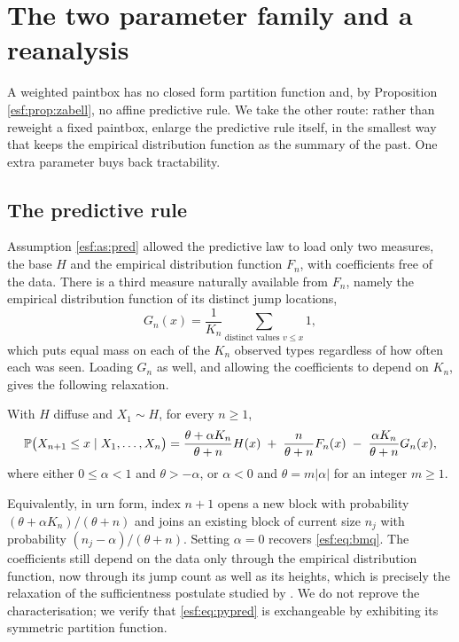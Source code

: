 \section{The two parameter family and a reanalysis}
\label{esf:sec:twoparam}

A weighted paintbox has no closed form partition function and, by Proposition
\ref{esf:prop:zabell}, no affine predictive rule. We take the other route: rather than
reweight a fixed paintbox, enlarge the predictive rule itself, in the smallest way
that keeps the empirical distribution function as the summary of the past. One extra
parameter buys back tractability.

\subsection{The predictive rule}

Assumption \ref{esf:as:pred} allowed the predictive law to load only two measures, the
base $H$ and the empirical distribution function $F_n$, with coefficients free of the
data. There is a third measure naturally available from $F_n$, namely the empirical
distribution function of its distinct jump locations,
\[
G_n(x) = \frac{1}{K_n} \sum_{\text{distinct values } v \le x} 1 ,
\]
which puts equal mass on each of the $K_n$ observed types regardless of how often each
was seen. Loading $G_n$ as well, and allowing the coefficients to depend on $K_n$,
gives the following relaxation.

\begin{assumption}
\label{esf:as:pred2}
With $H$ diffuse and $X_1 \sim H$, for every $n \ge 1$,
\begin{equation}
\mathbb{P}\bigl(X_{n+1} \le x \mid X_1, \dots, X_n \bigr)
= \frac{\theta + \alpha K_n}{\theta + n} H(x)
\; + \; \frac{n}{\theta+n} F_n(x)
\; - \; \frac{\alpha K_n}{\theta+n} G_n(x),
\label{esf:eq:pypred}
\end{equation}
where either $0 \le \alpha < 1$ and $\theta > -\alpha$, or $\alpha < 0$ and
$\theta = m |\alpha|$ for an integer $m \ge 1$.
\end{assumption}

Equivalently, in urn form, index $n+1$ opens a new block with probability
$(\theta + \alpha K_n)/(\theta+n)$ and joins an existing block of current size $n_j$
with probability $(n_j - \alpha)/(\theta+n)$. Setting $\alpha = 0$ recovers
\eqref{esf:eq:bmq}. The coefficients still depend on the data only through the empirical
distribution function, now through its jump count as well as its heights, which is
precisely the relaxation of the sufficientness postulate studied by \citet{esf:zabell1997}. We
do not reprove the characterisation; we verify that \eqref{esf:eq:pypred} is exchangeable
by exhibiting its symmetric partition function.

